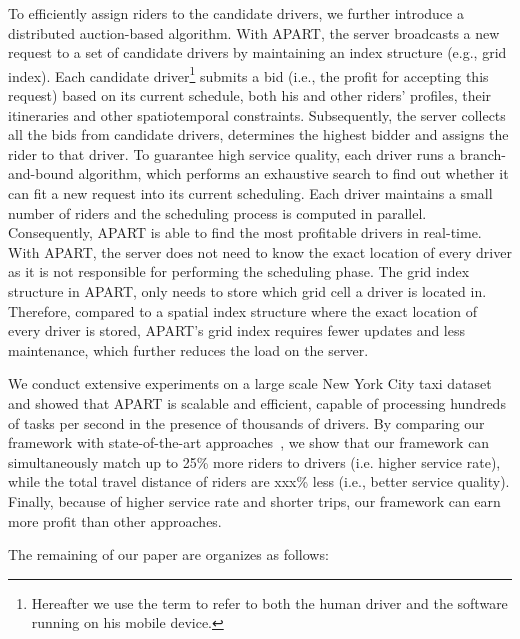 To efficiently assign riders to the candidate drivers, we further introduce a distributed auction-based algorithm. With APART, the server broadcasts a new request to a set of candidate drivers by maintaining an index structure (e.g., grid index). Each candidate driver\footnote{Hereafter we use the term  to refer to both the human driver and the software running on his mobile device.} submits a bid (i.e., the profit for accepting this request) based on its current schedule, both his and other riders' profiles, their itineraries and other spatiotemporal constraints. Subsequently, the server collects all the bids from candidate drivers, determines the highest bidder and assigns the rider to that driver. To guarantee high service quality, each driver runs a branch-and-bound algorithm, which performs an exhaustive search to find out whether it can fit a new request into its current scheduling. Each driver maintains a small number of riders and the scheduling process is computed in parallel. Consequently, APART is able to find the most profitable drivers in real-time. With APART, the server does not need to know the exact location of every driver as it is not responsible for performing the scheduling phase. The grid index structure in APART, only needs to store which grid cell a driver is located in. Therefore, compared to a spatial index structure where the exact location of every driver is stored, APART's grid index requires fewer updates and less maintenance, which further reduces the load on the server.

We conduct extensive experiments on a large scale New York City taxi dataset and showed that APART is scalable and efficient, capable of processing hundreds of tasks per second in the presence of thousands of drivers. By comparing our framework with state-of-the-art approaches~\cite{Huang14}, we show that our framework can simultaneously match up to 25\% more riders to drivers (i.e. higher service rate), while the total travel distance of riders are xxx\% less (i.e., better service quality). Finally, because of higher service rate and shorter trips, our framework can earn more profit than other approaches.

The remaining of our paper are organizes as follows:



